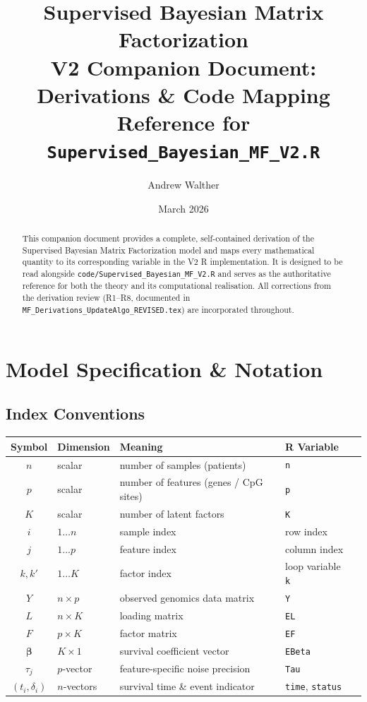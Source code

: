 \documentclass[11pt]{article}
\title{\textbf{Supervised Bayesian Matrix Factorization}\\
       \large V2 Companion Document: Derivations \& Code Mapping\\[4pt]
       \normalsize Reference for \texttt{Supervised\_Bayesian\_MF\_V2.R}}
\author{Andrew Walther}
\date{March 2026}
\newcommand{\coderef}[1]{{\color{blue!70!black}\texttt{#1}}}
\begin{document}
\maketitle

\begin{abstract}
This companion document provides a complete, self-contained derivation of the
Supervised Bayesian Matrix Factorization model and maps every mathematical
quantity to its corresponding variable in the V2 R implementation.  It is
designed to be read alongside \texttt{code/Supervised\_Bayesian\_MF\_V2.R} and
serves as the authoritative reference for both the theory and its
computational realisation.  All corrections from the derivation review
(R1--R8, documented in \texttt{MF\_Derivations\_UpdateAlgo\_REVISED.tex}) are
incorporated throughout.
\end{abstract}

\tableofcontents
\newpage

\section{Model Specification \& Notation}\label{sec:model}

\subsection{Index Conventions}

\begin{center}
\begin{tabular}{cllll}
\toprule
\textbf{Symbol} & \textbf{Dimension} & \textbf{Meaning} & \textbf{R Variable} \\
\midrule
$n$ & scalar & number of samples (patients) & \coderef{n} \\
$p$ & scalar & number of features (genes / CpG sites) & \coderef{p} \\
$K$ & scalar & number of latent factors & \coderef{K} \\
$i$ & $1\ldots n$ & sample index & row index \\
$j$ & $1\ldots p$ & feature index & column index \\
$k, k'$ & $1\ldots K$ & factor index & loop variable \coderef{k} \\
$Y$ & $n\times p$ & observed genomics data matrix & \coderef{Y} \\
$L$ & $n\times K$ & loading matrix & \coderef{EL} \\
$F$ & $p\times K$ & factor matrix & \coderef{EF} \\
$\bm{\beta}$ & $K\times 1$ & survival coefficient vector & \coderef{EBeta} \\
$\tau_j$ & $p$-vector & feature-specific noise precision & \coderef{Tau} \\
$(t_i,\delta_i)$ & $n$-vectors & survival time \& event indicator & \coderef{time}, \coderef{status} \\
\bottomrule
\end{tabular}
\end{center}
\end{document}

